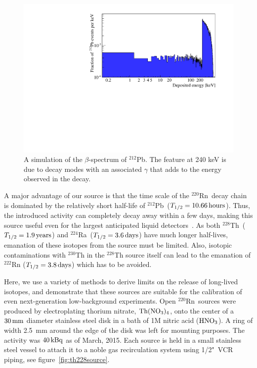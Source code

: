 \begin{figure}[htbp]
\centering
    \includegraphics[trim = 5 0 50 15, clip = true,width = 0.8\columnwidth]{figures/rnsource/pb212_spectrum}
    \caption{A simulation of the $\beta$-spectrum of $^{212}$Pb. The feature at 240 keV is due to decay modes with an associated $\gamma$ that adds to the energy observed in the decay.}\label{fig:pb212spectrum}
\end{figure}

A major advantage of our source is that the time scale of the $^{220}$Rn~decay chain is dominated by the relatively short half-life of $^{212}$Pb~($T_{1/2}=10.66\,\mathrm{hours}$). Thus, the introduced activity can completely decay away within a few days, making this source useful even for the largest anticipated liquid detectors~\cite{Aalbers:2016jon,Akerib:2018lyp,Franco:2015pha}. As both $^{228}$Th~($T_{1/2}=1.9\,\mathrm{years}$) and $^{224}$Ra~($T_{1/2}=3.6\,\mathrm{days}$) have much longer half-lives, emanation of these isotopes from the source must be limited. Also, isotopic contaminations with $^{230}$Th in the $^{228}$Th source itself can lead to the emanation of $^{222}$Rn ($T_{1/2}=3.8\,\mathrm{days}$) which has to be avoided.

Here, we use a variety of methods to derive limits on the release of long-lived isotopes, and demonstrate that these sources are suitable for the calibration of even next-generation low-background experiments. Open $^{220}$Rn~sources were produced by electroplating thorium nitrate, $\mathrm{Th}(\mathrm{NO}_3)_4$, onto the center of a $30\,\mathrm{mm}$ diameter stainless steel disk in a bath of 1M nitric acid ($\mathrm{HNO}_3$). A ring of width 2.5~mm around the edge of the disk was left for mounting purposes. The activity was $40\,\mathrm{kBq}$ as of March, 2015. Each source is held in a small stainless steel vessel to attach it to a noble gas recirculation system using 1/2"~VCR piping, see figure~\ref{fig:th228source}.

